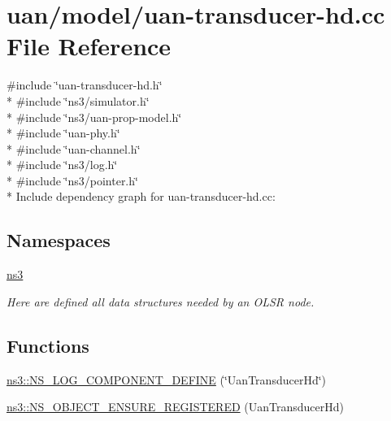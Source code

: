 \hypertarget{uan-transducer-hd_8cc}{}\section{uan/model/uan-\/transducer-\/hd.cc File Reference}
\label{uan-transducer-hd_8cc}
{\ttfamily \#include \char`\"{}uan-\/transducer-\/hd.\+h\char`\"{}}\\*
{\ttfamily \#include \char`\"{}ns3/simulator.\+h\char`\"{}}\\*
{\ttfamily \#include \char`\"{}ns3/uan-\/prop-\/model.\+h\char`\"{}}\\*
{\ttfamily \#include \char`\"{}uan-\/phy.\+h\char`\"{}}\\*
{\ttfamily \#include \char`\"{}uan-\/channel.\+h\char`\"{}}\\*
{\ttfamily \#include \char`\"{}ns3/log.\+h\char`\"{}}\\*
{\ttfamily \#include \char`\"{}ns3/pointer.\+h\char`\"{}}\\*
Include dependency graph for uan-\/transducer-\/hd.cc\+:
\subsection*{Namespaces}
\begin{DoxyCompactItemize}
\item 
 \hyperlink{namespacens3}{ns3}
\begin{DoxyCompactList}\small\item\em Here are defined all data structures needed by an O\+L\+SR node. \end{DoxyCompactList}\end{DoxyCompactItemize}
\subsection*{Functions}
\begin{DoxyCompactItemize}
\item 
\hyperlink{namespacens3_a95bc1dcb51a5ad8e319a97614778cccc}{ns3\+::\+N\+S\+\_\+\+L\+O\+G\+\_\+\+C\+O\+M\+P\+O\+N\+E\+N\+T\+\_\+\+D\+E\+F\+I\+NE} (\char`\"{}Uan\+Transducer\+Hd\char`\"{})
\item 
\hyperlink{namespacens3_a1169318582d37112838a1b30f09b51d2}{ns3\+::\+N\+S\+\_\+\+O\+B\+J\+E\+C\+T\+\_\+\+E\+N\+S\+U\+R\+E\+\_\+\+R\+E\+G\+I\+S\+T\+E\+R\+ED} (Uan\+Transducer\+Hd)
\end{DoxyCompactItemize}
